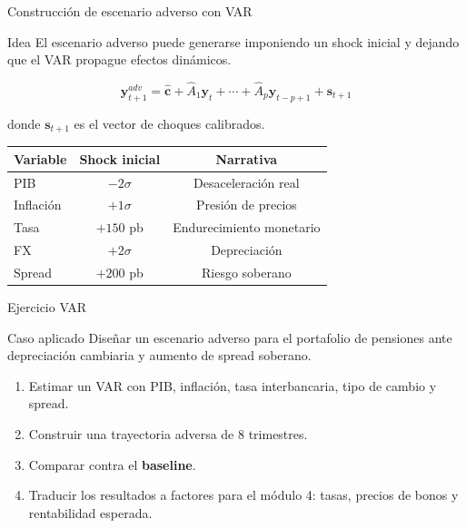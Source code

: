 \documentclass[10pt,aspectratio=169]{beamer}
\newcommand{\baseline}{\textcolor{MacropolTeal}{\textbf{baseline}}}
\begin{document}
\begin{frame}{Construcción de escenario adverso con VAR}
\begin{block}{Idea}
El escenario adverso puede generarse imponiendo un shock inicial y dejando que el VAR propague efectos dinámicos.
\end{block}

\[
\bm y_{t+1}^{adv} =
\hat{\bm c} + \hat A_1 \bm y_t + \cdots + \hat A_p \bm y_{t-p+1}
+ \bm s_{t+1}
\]

donde $\bm s_{t+1}$ es el vector de choques calibrados.

\vspace{0.6em}
\begin{table}
\small
\begin{tabular}{lcc}
\toprule
Variable & Shock inicial & Narrativa \\
\midrule
PIB & $-2\sigma$ & Desaceleración real \\
Inflación & $+1\sigma$ & Presión de precios \\
Tasa & $+150$ pb & Endurecimiento monetario \\
FX & $+2\sigma$ & Depreciación \\
Spread & $+200$ pb & Riesgo soberano \\
\bottomrule
\end{tabular}
\end{table}
\end{frame}

\begin{frame}{Ejercicio VAR}
\begin{block}{Caso aplicado}
Diseñar un escenario adverso para el portafolio de pensiones ante depreciación cambiaria y aumento de spread soberano.
\end{block}

\begin{enumerate}
  \item Estimar un VAR con PIB, inflación, tasa interbancaria, tipo de cambio y spread.
  \item Construir una trayectoria adversa de 8 trimestres.
  \item Comparar contra el \baseline{}.
  \item Traducir los resultados a factores para el módulo 4: tasas, precios de bonos y rentabilidad esperada.
\end{enumerate}
\end{frame}
\end{document}
